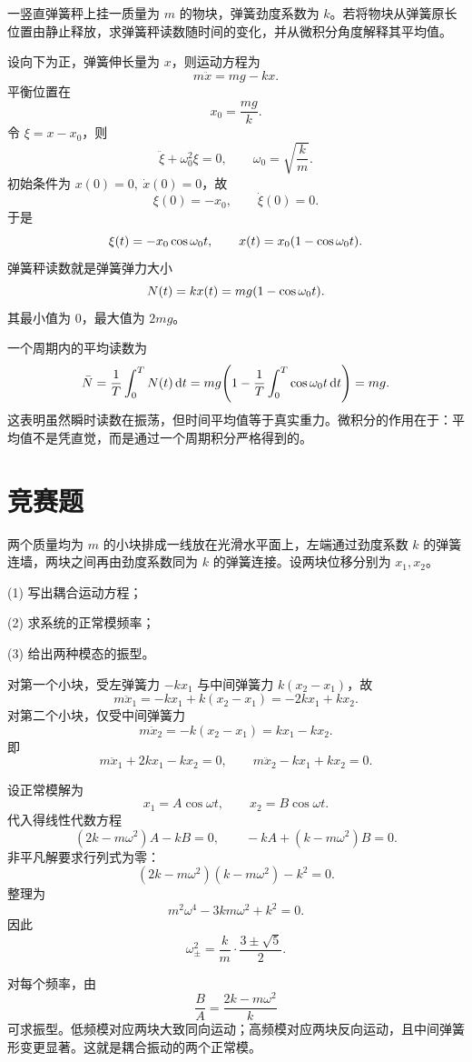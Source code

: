 \begin{classic}
一竖直弹簧秤上挂一质量为 $m$ 的物块，弹簧劲度系数为 $k$。若将物块从弹簧原长位置由静止释放，求弹簧秤读数随时间的变化，并从微积分角度解释其平均值。

\begin{solution}
设向下为正，弹簧伸长量为 $x$，则运动方程为
\[
m\ddot x=mg-kx.
\]
平衡位置在
\[
x_0=\frac{mg}{k}.
\]
令 $\xi=x-x_0$，则
\[
\ddot\xi+\omega_0^2\xi=0,
\qquad
\omega_0=\sqrt{\frac{k}{m}}.
\]
初始条件为 $x(0)=0,\ \dot x(0)=0$，故
\[
\xi(0)=-x_0,
\qquad
\dot\xi(0)=0.
\]
于是
\[
\xi(t)=-x_0\cos\omega_0 t,
\qquad
x(t)=x_0\qty(1-\cos\omega_0 t).
\]
弹簧秤读数就是弹簧弹力大小
\[
N(t)=kx(t)=mg\qty(1-\cos\omega_0 t).
\]
其最小值为 $0$，最大值为 $2mg$。

一个周期内的平均读数为
\[
\bar N=\frac1T\int_0^T N(t)\,\dd t=mg\qty(1-\frac1T\int_0^T \cos\omega_0 t\,\dd t)=mg.
\]
这表明虽然瞬时读数在振荡，但时间平均值等于真实重力。微积分的作用在于：平均值不是凭直觉，而是通过一个周期积分严格得到的。
\end{solution}
\end{classic}

\section*{竞赛题}

\begin{competition}
两个质量均为 $m$ 的小块排成一线放在光滑水平面上，左端通过劲度系数 $k$ 的弹簧连墙，两块之间再由劲度系数同为 $k$ 的弹簧连接。设两块位移分别为 $x_1,x_2$。

(1) 写出耦合运动方程；

(2) 求系统的正常模频率；

(3) 给出两种模态的振型。

\begin{solution}
对第一个小块，受左弹簧力 $-kx_1$ 与中间弹簧力 $k(x_2-x_1)$，故
\[
m\ddot x_1=-kx_1+k(x_2-x_1)=-2kx_1+kx_2.
\]
对第二个小块，仅受中间弹簧力
\[
m\ddot x_2=-k(x_2-x_1)=kx_1-kx_2.
\]
即
\[
m\ddot x_1+2kx_1-kx_2=0,
\qquad
m\ddot x_2-kx_1+kx_2=0.
\]

设正常模解为
\[
x_1=A\cos\omega t,
\qquad
x_2=B\cos\omega t.
\]
代入得线性代数方程
\[
(2k-m\omega^2)A-kB=0,
\qquad
-kA+(k-m\omega^2)B=0.
\]
非平凡解要求行列式为零：
\[
(2k-m\omega^2)(k-m\omega^2)-k^2=0.
\]
整理为
\[
m^2\omega^4-3km\omega^2+k^2=0.
\]
因此
\[
\omega_{\pm}^2=\frac{k}{m}\cdot\frac{3\pm\sqrt5}{2}.
\]

对每个频率，由
\[
\frac{B}{A}=\frac{2k-m\omega^2}{k}
\]
可求振型。低频模对应两块大致同向运动；高频模对应两块反向运动，且中间弹簧形变更显著。这就是耦合振动的两个正常模。
\end{solution}
\end{competition}

